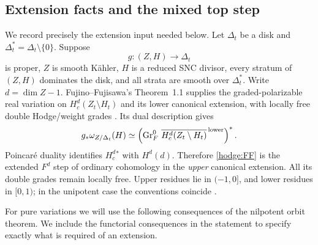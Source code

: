 \subsection{Extension facts and the mixed top step}
\label{hodge:extensionfacts}

We record precisely the extension input needed below.  Let
\(\Delta_t\) be a disk and \(\Delta_t^*=\Delta_t\setminus\{0\}\).
Suppose
\[
 g:(Z,H)\longrightarrow\Delta_t
\]
is proper, \(Z\) is smooth K\"ahler, \(H\) is a reduced SNC divisor,
every stratum of \((Z,H)\) dominates the disk, and all strata are
smooth over \(\Delta_t^*\).  Write \(d=\dim Z-1\).
Fujino--Fujisawa's Theorem~1.1 supplies the graded-polarizable real
variation on \(H_c^d(Z_t\setminus H_t)\) and its lower canonical
extension, with locally free double Hodge/weight grades
\cite[Theorem~1.1]{FF25}.  Its dual description gives
\begin{equation}
 g_*\omega_{Z/\Delta_t}(H)
 \simeq
 \left(\operatorname{Gr}_F^0\,
       \overline{H_c^d(Z_t\setminus H_t)}^{\,\mathrm{lower}}\right)^*.
 \label{hodge:FF}
\end{equation}
Poincar\'e duality identifies \(H_c^d{}^*\) with \(H^d(d)\).
Therefore \eqref{hodge:FF} is the extended \(F^d\) step of ordinary
cohomology in the \emph{upper} canonical extension.  All its double
grades remain locally free.  Upper residues lie in \((-1,0]\), and
lower residues in \([0,1)\); in the unipotent case the conventions
coincide \cite[Section~2.14]{FF25}.

For pure variations we will use the following consequences of the
nilpotent orbit theorem.  We include the functorial consequences in
the statement to specify exactly what is required of an extension.

